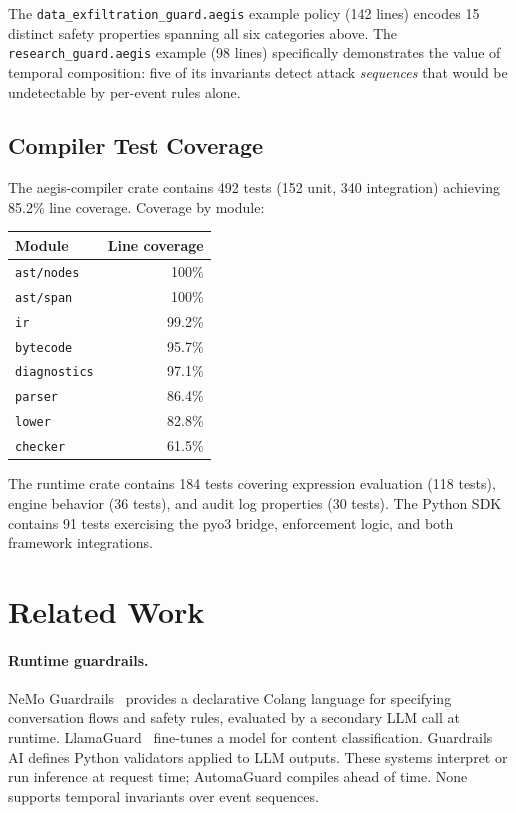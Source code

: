 \documentclass[sigconf]{acmart}
\begin{document}
The \texttt{data\_exfiltration\_guard.aegis} example policy (142 lines) encodes
15 distinct safety properties spanning all six categories above. The
\texttt{research\_guard.aegis} example (98 lines) specifically demonstrates
the value of temporal composition: five of its invariants detect attack
\emph{sequences} that would be undetectable by per-event rules alone.

\subsection{Compiler Test Coverage}

The aegis-compiler crate contains 492 tests (152 unit, 340 integration)
achieving 85.2\% line coverage. Coverage by module:

\begin{center}
\begin{tabular}{lr}
\toprule
Module & Line coverage \\
\midrule
\texttt{ast/nodes} & 100\% \\
\texttt{ast/span}  & 100\% \\
\texttt{ir}        & 99.2\% \\
\texttt{bytecode}  & 95.7\% \\
\texttt{diagnostics} & 97.1\% \\
\texttt{parser}    & 86.4\% \\
\texttt{lower}     & 82.8\% \\
\texttt{checker}   & 61.5\% \\
\bottomrule
\end{tabular}
\end{center}

The runtime crate contains 184 tests covering expression evaluation (118 tests),
engine behavior (36 tests), and audit log properties (30 tests). The Python SDK
contains 91 tests exercising the pyo3 bridge, enforcement logic, and both
framework integrations.


\section{Related Work}
\label{sec:related}

\paragraph{Runtime guardrails.}
NeMo Guardrails~\cite{rebedea2023nemo} provides a declarative Colang language
for specifying conversation flows and safety rules, evaluated by a secondary
LLM call at runtime. LlamaGuard~\cite{inan2023llama} fine-tunes a model for
content classification. Guardrails AI defines Python validators applied to
LLM outputs. These systems interpret or run inference at request time;
AutomaGuard compiles ahead of time. None supports temporal invariants over
event sequences.
\end{document}
